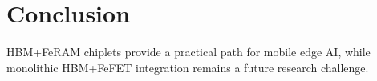 
\section{Conclusion}
HBM+FeRAM chiplets provide a practical path for mobile edge AI, while monolithic HBM+FeFET integration
remains a future research challenge.

